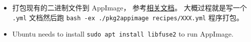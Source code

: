 
\begin{issues}
\issueDraft
\end{issues}

\begin{itemize}
\item 打包现有的二进制文件到 AppImage， 参考\href{https://docs.appimage.org/packaging-guide/converting-binary-packages/index.html#ref-convert-existing-binary-packages}{相关文档}。 大概过程就是写一个 \verb|.yml| 文档然后跑 \verb|bash -ex ./pkg2appimage recipes/XXX.yml| 程序打包。
\item Ubuntu needs to install \verb|sudo apt install libfuse2| to run AppImage.
\end{itemize}
